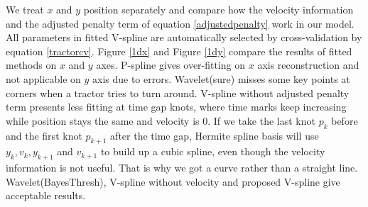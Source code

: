 We treat $x$ and $y$ position separately and compare how the velocity information and the adjusted penalty term of equation \eqref{adjustedpenalty} work in our model. All parameters in fitted V-spline are automatically selected by cross-validation by equation \eqref{tractorcv}. Figure \ref{1dx} and Figure \ref{1dy} compare the results of fitted methods on $x$ and $y$ axes. P-spline gives over-fitting on $x$ axis reconstruction and not applicable on $y$ axis due to errors. Wavelet(sure) misses some key points at corners when a tractor tries to turn around. V-spline without adjusted penalty term presents less fitting at time gap knots, where time marks keep increasing while position stays the same and velocity is 0. If we take the last knot $p_k$ before and the first knot $p_{k+1}$ after the time gap, Hermite spline basis will use $y_k, v_k, y_{k+1}$ and $v_{k+1}$ to build up a cubic spline, even though the velocity information is not useful. That is why we got a curve rather than a straight line. Wavelet(BayesThresh), V-spline without velocity and proposed V-spline give acceptable results.


